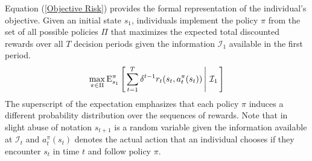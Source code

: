 \noindent Equation (\ref{Objective Risk}) provides the formal representation of the individual's objective. Given an initial state $s_1$, individuals implement the policy $\pi$ from the set of all possible policies $\Pi$ that maximizes the expected total discounted rewards over all $T$ decision periods given the information $\mathcal{I}_1$ available in the first period.
%
\begin{align}\label{Objective Risk}
\max_{\pi \in\Pi} \mathrm{E}_{s_1}^\pi\left[\left.\sum^{T}_{t = 1}  \delta^{t - 1} r_t(s_t, a^\pi_t(s_t))\,\right\vert\,\mathcal{I}_1\,\right]
\end{align}
%
The superscript of the expectation emphasizes that each policy $\pi$ induces a different probability distribution over the sequences of rewards. Note that in slight abuse of notation $s_{t + 1}$ is a random variable given the information available at $\mathcal{I}_t$ and $a^\pi_{t}(s_{t})$ denotes the actual action that an individual chooses if they encounter $s_{t}$ in time $t$ and follow policy $\pi$.
